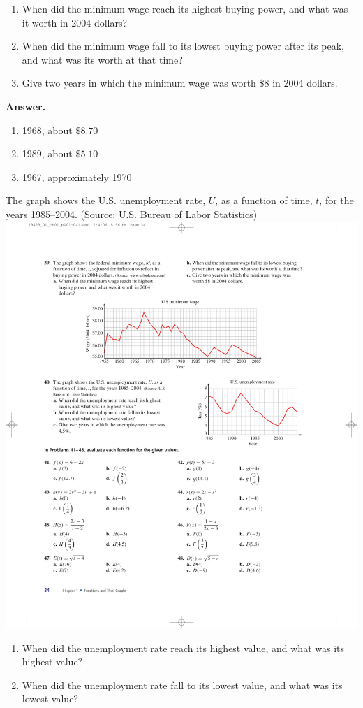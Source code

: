 \documentclass[10pt,]{book}
\theoremstyle{plain}
\theoremstyle{definition}
\theoremstyle{definition}
\theoremstyle{definition}
\theoremstyle{definition}
\numberwithin{equation}{part}
\begin{document}
\begin{exerciselist}
\begin{exercisegroup}
 \leavevmode%
\begin{enumerate}[label=\alph*]
\item\hypertarget{li-396}{}When did the minimum wage reach its highest buying power, and what was it worth in 2004 dollars?%
\item\hypertarget{li-397}{}When did the minimum wage fall to its lowest buying power after its peak, and what was its worth at that time?%
\item\hypertarget{li-398}{}Give two years in which the minimum wage was worth \(\$8\) in 2004 dollars.%
\end{enumerate}
%
\par\smallskip
\noindent\textbf{Answer.}\hypertarget{answer-63}{}\quad
\leavevmode%
\begin{enumerate}[label=\alph*]
\item\hypertarget{li-399}{}1968, about \(\$8.70\)%
\item\hypertarget{li-400}{}1989, about \(\$5.10\)%
\item\hypertarget{li-401}{}1967, approximately 1970%
\end{enumerate}
%
\exercise[40.]\hypertarget{exercise-109}{}The graph shows the U.S. unemployment rate, \(U\), as a function of time, \(t\), for the years 1985–2004. (Source: U.S. Bureau of Labor Statistics) \includegraphics[width=0.6\linewidth]{images/fig-ex-1-2-40}
 \leavevmode%
\begin{enumerate}[label=\alph*]
\item\hypertarget{li-402}{}When did the unemployment rate reach its highest value, and what was its highest value?%
\item\hypertarget{li-403}{}When did the unemployment rate fall to its lowest value, and what was its lowest value?%

\end{enumerate}
\end{exercisegroup}
\end{exerciselist}
\end{document}
